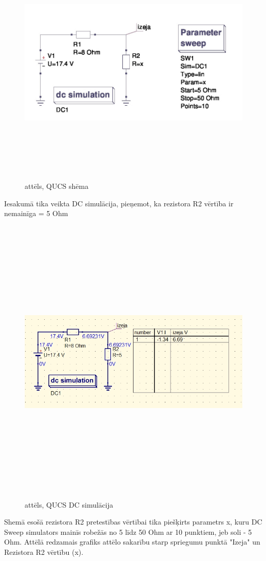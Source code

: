 \documentclass[a4paper,10pt]{report}
\begin{document}
\begin{figure}[H]
\includegraphics[width=12cm,height=12cm,keepaspectratio]{qucsShema.jpg}
\caption{attēls, QUCS shēma}
\end{figure}
Iesakumā tika veikta DC simulācija, pieņemot, ka rezistora R2 vērtība ir nemainīga = 5 Ohm
\begin{figure}[H]
\includegraphics[width=14cm,height=14cm,keepaspectratio]{qucsDCsim.jpg}
\caption{attēls, QUCS DC simulācija}
\end{figure}
Shemā esošā rezistora R2 pretestības vērtībai tika piešķirts parametrs x, kuru DC Sweep simulators mainīs robežās no 5 līdz 50 Ohm ar 10 punktiem, jeb soli - 5 Ohm.
Attēlā redzamais grafiks attēlo sakarību starp spriegumu punktā "Izeja" un Rezistora R2 vērtību (x).
\end{document}
